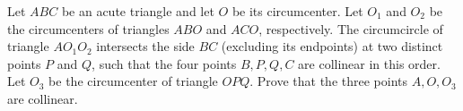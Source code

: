 Let $ABC$ be an acute triangle and let $O$ be its circumcenter. Let $O_1$ and $O_2$ be the circumcenters of triangles $ABO$ and $ACO$, respectively. The circumcircle of triangle $AO_1O_2$ intersects the side $BC$ (excluding its endpoints) at two distinct points $P$ and $Q$, such that the four points $B, P, Q, C$ are collinear in this order. Let $O_3$ be the circumcenter of triangle $OPQ$. Prove that the three points $A, O, O_3$ are collinear.